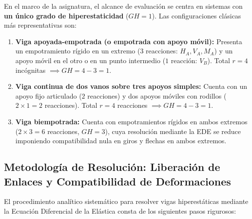 \begin{tcolorbox}[colback=blue!5, colframe=blue!75!black, title=\textbf{Tipologías Estructurales con 1 Grado de Hiperestaticidad ($GH = 1$)}]
    En el marco de la asignatura, el alcance de evaluación se centra en sistemas con \textbf{un único grado de hiperestaticidad} ($GH = 1$). Las configuraciones clásicas más representativas son:
    \begin{enumerate}
        \item \textbf{Viga apoyada-empotrada (o empotrada con apoyo móvil):} Presenta un empotramiento rígido en un extremo ($3$ reacciones: $H_A, V_A, M_A$) y un apoyo móvil en el otro o en un punto intermedio ($1$ reacción: $V_B$). Total $r = 4$ incógnitas $\implies GH = 4 - 3 = 1$.
        \item \textbf{Viga continua de dos vanos sobre tres apoyos simples:} Cuenta con un apoyo fijo articulado ($2$ reacciones) y dos apoyos móviles con rodillos ($2 \times 1 = 2$ reacciones). Total $r = 4$ reacciones $\implies GH = 4 - 3 = 1$.
        \item \textbf{Viga biempotrada:} Cuenta con empotramientos rígidos en ambos extremos ($2 \times 3 = 6$ reacciones, $GH = 3$), cuya resolución mediante la EDE se reduce imponiendo compatibilidad nula en giros y flechas en ambos extremos.
    \end{enumerate}
\end{tcolorbox}

\subsection{Metodología de Resolución: Liberación de Enlaces y Compatibilidad de Deformaciones}

El procedimiento analítico sistemático para resolver vigas hiperestáticas mediante la Ecuación Diferencial de la Elástica consta de los siguientes pasos rigurosos:

